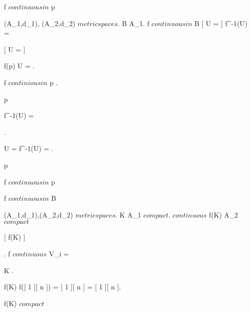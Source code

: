 {{{{			f $ continuous in $ p \imp {}		
		}		
	}}



	{
	{
		(A_1,d_1), (A_2,d_2) $ metric spaces $.
		B \subset A_1.
	}
	\holds
	{
		f $ continuous in $ B \ifandonlyif {}[ U =  ]
		{
			f^{-1}(U) = 
		}
	}
	\demonstration
	{
		\rightway
		{
			[ U =  ]
			{
				{
					f(p) \in U =  \imp {}.

					f $ continious in $ p \imp {}.

					p \in {}
				}

				f^{-1}(U) = 
			}
		}
		\leftway
		{
			{
				\all{ \eps \in \R^+ }
				{
					.

					U =  \imp f^{-1}(U) = .

					p \in {} \imp {}
				}

				f $ continuous in $ p
			}

			f $ continuous in $ B
		}	
	}}



	{
	{
		(A_1,d_1),(A_2,d_2) $ metric spaces $.
		K \subset A_1 $ compact $.
		 $ continuous $
	}
	\holds
	{
		f(K) \subset A_2 $ compact $
	}
	\demonstration
	{
		[ f(K) \subset {} ]
		{
			{
				.
				f $ continuous $ \imp V_i = 
			}

			K \subset {} \imp {}.

			f(K) \subset f([ 1 ][ n ]) = [ 1 ][ n ] = [ 1 ][ n ].
		}

		f(K) $ compact $
	}}



}
